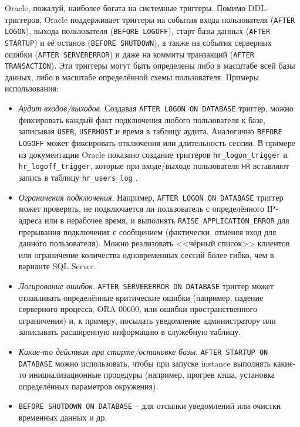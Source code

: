  Oracle, пожалуй, наиболее богата на системные триггеры. Помимо DDL-триггеров, Oracle поддерживает триггеры на события входа пользователя (\texttt{AFTER LOGON}), выхода пользователя (\texttt{BEFORE LOGOFF}), старт базы данных (\texttt{AFTER STARTUP}) и её останов (\texttt{BEFORE SHUTDOWN}), а также на события серверных ошибки (\texttt{AFTER SERVERERROR}) и даже на коммиты транзакций (\texttt{AFTER TRANSACTION}). Эти триггеры могут быть определены либо в масштабе всей базы данных, либо в масштабе определённой схемы пользователя. 
 Примеры использования:
 \begin{itemize}
    \item \textit{Аудит входов/выходов}. Создавая \texttt{AFTER LOGON ON DATABASE} триггер, можно фиксировать каждый факт подключения любого пользователя к базе, записывая \texttt{USER}, \texttt{USERHOST} и время в таблицу аудита. Аналогично \texttt{BEFORE LOGOFF} может фиксировать отключения или длительность сессии. В примере из документации Oracle показано создание триггеров \texttt{hr\_logon\_trigger} и \texttt{hr\_logoff\_trigger}, которые при входе/выходе пользователя \texttt{HR} вставляют запись в таблицу \texttt{hr\_users\_log} \autocite{oracledbdoc8}.
    \item \textit{Ограничения подключения}. Например, \texttt{AFTER LOGON ON DATABASE} триггер может проверять, не подключается ли пользователь с определённого IP-адреса или в нерабочее время, и выполнять \texttt{RAISE\_APPLICATION\_ERROR} для прерывания подключения с сообщением (фактически, отменяя вход для данного пользователя). Можно реализовать <<чёрный список>> клиентов или ограничение количества одновременных сессий более гибко, чем в варианте SQL Server.
    \item \textit{Логирование ошибок}. \texttt{AFTER SERVERERROR ON DATABASE} триггер может отлавливать определённые критические ошибки (например, падение серверного процесса, ORA-00600, или ошибки пространственного ограничения) и, к примеру, посылать уведомление администратору или записывать расширенную информацию в служебную таблицу.
    \item \textit{Какие-то действия при старте/остановке базы}. \texttt{AFTER STARTUP ON DATABASE} можно использовать, чтобы при запуске instance выполнять какие-то инициализационные процедуры (например, прогрев кэша, установка определённых параметров окружения).
    \item \texttt{BEFORE SHUTDOWN ON DATABASE} – для отсылки уведомлений или очистки временных данных и др.
 \end{itemize}

